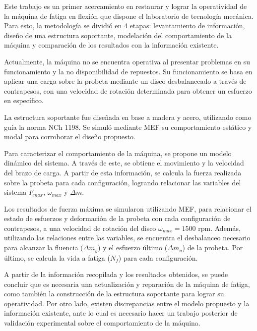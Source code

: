 
Este trabajo es un primer acercamiento en restaurar y lograr la operatividad de la máquina de fatiga en flexión que dispone el laboratorio de tecnología mecánica. Para esto, la metodología se dividió en 4 etapas: levantamiento de información, diseño de una estructura soportante, modelación del comportamiento de la máquina y comparación de los resultados con la información existente.

Actualmente, la máquina no se encuentra operativa al presentar problemas en su funcionamiento y la no disponibilidad de repuestos. Su funcionamiento se basa en aplicar una carga sobre la probeta mediante un disco desbalanceado a través de contrapesos, con una velocidad de rotación determinada para obtener un esfuerzo en específico.

La estructura soportante fue diseñada en base a madera y acero, utilizando como guía la norma NCh 1198. Se simuló mediante MEF su comportamiento estático y modal para corroborar el diseño propuesto.

Para caracterizar el comportamiento de la máquina, se propone un modelo dinámico del sistema. A través de este, se obtiene el movimiento y la velocidad del brazo de carga. A partir de esta información, se calcula la fuerza realizada sobre la probeta para cada configuración, logrando relacionar las variables del sistema $F_{max}$, $\omega_{max}$ y $\Delta m$. 

Los resultados de fuerza máxima se simularon utilizando MEF, para relacionar el estado de esfuerzos y deformación de la probeta con cada configuración de contrapesos, a una velocidad de rotación del disco $\omega_{max}=1500$ rpm. Además, utilizando las relaciones entre las variables, se encuentra el desbalanceo necesario para alcanzar la fluencia ($\Delta m_y$) y el esfuerzo último ($\Delta m_u$) de la probeta. Por último, se calcula la vida a fatiga ($N_f$) para cada configuración.

A partir de la información recopilada y los resultados obtenidos, se puede concluir que es necesaria una actualización y reparación de la máquina de fatiga, como también la construcción de la estructura soportante para lograr su operatividad. Por otro lado, existen discrepancias entre el modelo propuesto y la información existente, ante lo cual es necesario hacer un trabajo posterior de validación experimental sobre el comportamiento de la máquina.


